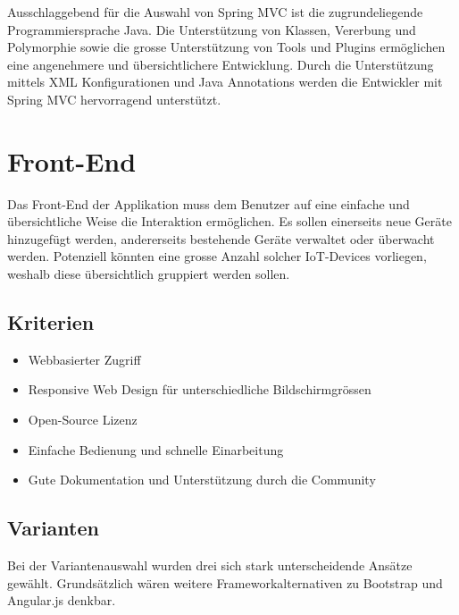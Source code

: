 Ausschlaggebend für die Auswahl von Spring MVC ist die zugrundeliegende Programmiersprache Java. Die Unterstützung von Klassen, Vererbung und Polymorphie sowie die grosse Unterstützung von Tools und Plugins ermöglichen eine angenehmere und übersichtlichere Entwicklung. Durch die Unterstützung mittels XML Konfigurationen und Java Annotations werden die Entwickler mit Spring MVC hervorragend unterstützt.

\newpage
\section{Front-End}
Das Front-End der Applikation muss dem Benutzer auf eine einfache und übersichtliche Weise die Interaktion ermöglichen. Es sollen einerseits neue Geräte hinzugefügt werden, andererseits bestehende Geräte verwaltet oder überwacht werden. Potenziell könnten eine grosse Anzahl solcher IoT-Devices vorliegen, weshalb diese übersichtlich gruppiert werden sollen.

\subsection{Kriterien}
\begin{itemize}
\item Webbasierter Zugriff
\item Responsive Web Design für unterschiedliche Bildschirmgrössen
\item Open-Source Lizenz
\item Einfache Bedienung und schnelle Einarbeitung
\item Gute Dokumentation und Unterstützung durch die Community
\end{itemize}

\subsection{Varianten}
Bei der Variantenauswahl wurden drei sich stark unterscheidende Ansätze gewählt. Grundsätzlich wären weitere Frameworkalternativen zu Bootstrap und Angular.js denkbar.

